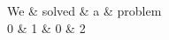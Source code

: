 \documentclass[border=2mm]{standalone}
\begin{document}
\normalsize

\begin{dependency}[theme = simple]
    \begin{deptext}[column sep=1em, font=\fontsize{10}{12}\selectfont]
        We \& solved \& a \& problem \\
        0 \& 1 \& 0 \& 2 \\
    \end{deptext}
\end{dependency}
\end{document}
